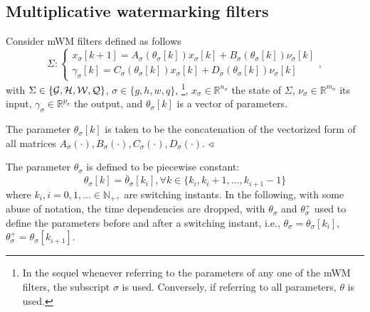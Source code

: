 \subsection{Multiplicative watermarking filters}
Consider mWM filters defined as follows
\begin{equation}\label{eq:sys:WM}
		\Sigma: \begin{cases}
			x_\sigma[k+1] = A_\sigma(\theta_\sigma[k]) x_\sigma [k] + B_\sigma(\theta_\sigma[k]) \nu_\sigma [k]\\
			\gamma_\sigma [k] = C_\sigma(\theta_\sigma[k]) x_\sigma [k] + D_\sigma(\theta_\sigma[k]) \nu_\sigma [k]
		\end{cases},
	\end{equation}
	with $\Sigma \in \{\mathcal{G},\mathcal{H},\mathcal{W},\mathcal{Q}\}$, $\sigma \in \{g,h,w,q\}$, \footnote{In the sequel whenever referring to the parameters of any one of the mWM filters, the subscript $\sigma$ is used. Conversely, if referring to all parameters, $\theta$ is used.}, $x_\sigma \in \mathbb{R}^{n_\sigma}$ the state of $\Sigma$, $\nu_\sigma \in \mathbb{R}^{m_\sigma}$ its input, $\gamma_\sigma \in \mathbb{R}^{p_\sigma}$ the output, and $\theta_{\sigma}[k]$ is a vector of parameters.

\begin{definition}
    The parameter $\theta_\sigma[k]$ is taken to be the concatenation of the vectorized form of all matrices $A_\sigma(\cdot), B_\sigma(\cdot), C_\sigma(\cdot), D_\sigma(\cdot)$.
    $\hfill\triangleleft$
\end{definition}

The parameter $\theta_{\sigma}$ is defined to be piecewise constant:
$$\theta_\sigma[k] = \bar{\theta}_\sigma[k_i], \forall k \in \{k_i, k_i+1, \dots, k_{i+1}-1\}$$
where $k_i, i = 0,1, \dots \in \mathbb{N}_+,$ are switching instants. In the following, with some abuse of notation, the time dependencies are dropped, with $\theta_\sigma$ and $\theta_\sigma^+$ used to define the parameters before and after a switching instant, 
i.e., $\theta_\sigma = \theta_\sigma[k_i]$, $\theta_\sigma^+ = \theta_\sigma[k_{i+1}]$.
% 


